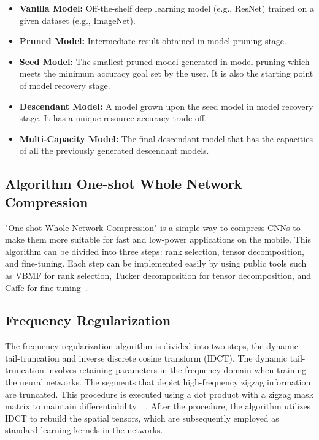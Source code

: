\documentclass{article}
\begin{document}
\begin{itemize}
	\item \textbf{Vanilla Model:} Off-the-shelf deep learning model (e.g., ResNet) trained on a given dataset (e.g., ImageNet).
	
	\item \textbf{Pruned Model:} Intermediate result obtained in model pruning stage.
	
	\item \textbf{Seed Model:} The smallest pruned model generated in model pruning which meets the minimum accuracy goal set by the user. It is also the starting point of model recovery stage.
	
	\item \textbf{Descendant Model:} A model grown upon the seed model in model recovery stage. It has a unique resource-accuracy trade-off.
	
	\item \textbf{Multi-Capacity Model:} The final descendant model that has the capacities of all the previously generated descendant models.
	
\end{itemize}



\subsection{Algorithm One-shot Whole Network Compression}\label{oneshot}
"One-shot Whole Network Compression" is a simple way to compress CNNs to make them more suitable for fast and low-power applications on the mobile. This algorithm can be divided into three steps: rank selection, tensor decomposition, and fine-tuning. Each step can be implemented easily by using public tools such as VBMF for rank selection, Tucker decomposition for tensor decomposition, and Caffe for fine-tuning~\cite{kim2016compression}.

\subsection{Frequency Regularization}\label{fr}
The frequency regularization algorithm is divided into two steps, the dynamic tail-truncation and inverse discrete cosine transform (IDCT). The dynamic tail-truncation involves retaining parameters in the frequency domain when training the neural networks. The segments that depict high-frequency zigzag information are truncated. This procedure is executed using a dot product with a zigzag mask matrix to maintain differentiability. ~\cite{zhao2023frequency}. After the procedure, the algorithm utilizes IDCT to rebuild the spatial tensors, which are subsequently employed as standard learning kernels in the networks.
\end{document}
